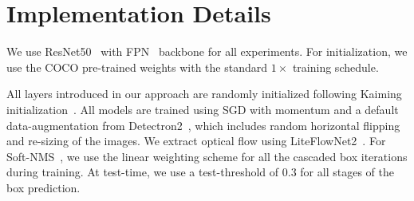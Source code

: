 \section{Implementation Details}
We use
ResNet50~\cite{he2016deep} with FPN~\cite{lin2017feature} backbone for all experiments. 
For initialization, we use the COCO pre-trained weights with the standard $1\times$ training schedule. 

All layers introduced in our approach are randomly initialized following Kaiming initialization~\cite{he2015delving}.  %
%
All models are trained using SGD with momentum and a default data-augmentation from Detectron2~\cite{wu2019detectron2}, which includes random horizontal flipping and re-sizing of the images. We extract optical flow using LiteFlowNet2~\cite{hui2020lightweight}.
For Soft-NMS~\cite{bodla2017soft}, we use the linear weighting scheme for all the cascaded box iterations during training. At test-time, we use a test-threshold of $0.3$ for all stages of the box prediction.
